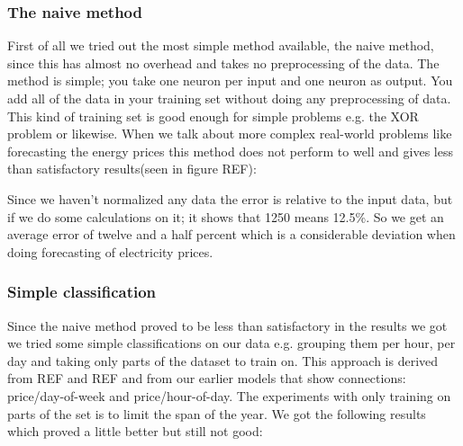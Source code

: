 \subsubsection{The naive method}
First of all we tried out the most simple method available, the naive method, since this has almost no overhead and takes no preprocessing of the data. The method is simple; you take one neuron per input and one neuron as output. You add all of the data in your training set without doing any preprocessing of data. This kind of training set is good enough for simple problems e.g. the XOR problem or likewise. When we talk about more complex real-world problems like forecasting the energy prices this method does not perform to well and gives less than satisfactory results(seen in figure REF):

\begin{table}[!ht]\footnotesize
\centering  %
\caption{Results from the naive training approach.} %
\label{table:naiveTrainingApproach} %
\end{table}

Since we haven't normalized any data the error is relative to the input data, but if we do some calculations on it; it shows that 1250 means 12.5\%. So we get an average error of twelve and a half percent which is a considerable deviation when doing forecasting of electricity prices. 
\subsubsection{Simple classification}
Since the naive method proved to be less than satisfactory in the results we got we tried some simple classifications on our data e.g. grouping them per hour, per day and taking only parts of the dataset to train on. This approach is derived from REF and REF and from our earlier models that show connections: price/day-of-week and price/hour-of-day. The experiments with only training on parts of the set is to limit the span of the year. We got the following results which proved a little better but still not good:

